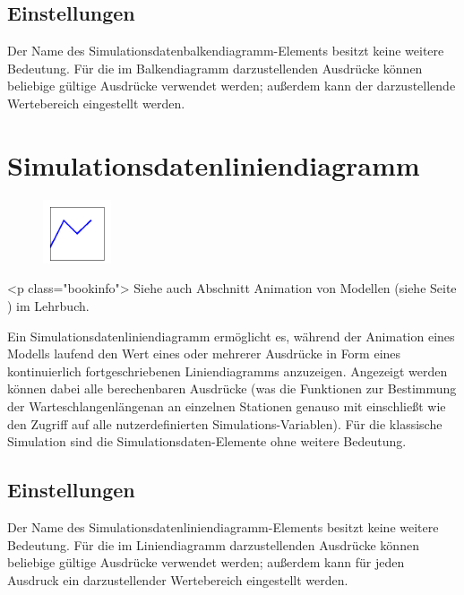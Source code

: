 \subsection*{Einstellungen}

Der Name des Simulationsdatenbalkendiagramm-Elements besitzt keine weitere Bedeutung. Für die im
Balkendiagramm darzustellenden Ausdrücke können beliebige gültige Ausdrücke verwendet werden;
außerdem kann der darzustellende Wertebereich eingestellt werden.


\section{Simulationsdatenliniendiagramm}
\label{ref:ModelElementAnimationDiagram}

\begin{figure}
\vspace{-22pt}
\includegraphics[width=2cm]{imageModelElementAnimationDiagram.png}
\vspace{-22pt}
\end{figure}

<p class="bookinfo">
Siehe auch Abschnitt Animation von Modellen (siehe Seite \pageref{ref:book:5.4.3}) im Lehrbuch.

Ein Simulationsdatenliniendiagramm ermöglicht es, während der Animation eines Modells laufend den Wert
eines oder mehrerer Ausdrücke in Form eines kontinuierlich fortgeschriebenen Liniendiagramms anzuzeigen.
Angezeigt werden können dabei alle berechenbaren Ausdrücke (was die Funktionen zur Bestimmung der
Warteschlangenlängenan an einzelnen Stationen genauso mit einschließt wie den Zugriff auf alle
nutzerdefinierten Simulations-Variablen). Für die klassische Simulation sind die
Simulationsdaten-Elemente ohne weitere Bedeutung.

\subsection*{Einstellungen}

Der Name des Simulationsdatenliniendiagramm-Elements besitzt keine weitere Bedeutung. Für die im
Liniendiagramm darzustellenden Ausdrücke können beliebige gültige Ausdrücke verwendet werden;
außerdem kann für jeden Ausdruck ein darzustellender Wertebereich eingestellt werden.



